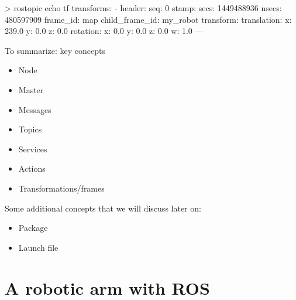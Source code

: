 \documentclass[compress]{beamer}
\begin{document}
%
%
%
%

\begin{frame}[containsverbatim]{}
\begin{shcode}
> rostopic echo tf
transforms: 
  - 
    header: 
      seq: 0
      stamp: 
        secs: 1449488936
        nsecs: 480597909
      frame_id: map
    child_frame_id: my_robot
    transform: 
      translation: 
        x: 239.0
        y: 0.0
        z: 0.0
      rotation: 
        x: 0.0
        y: 0.0
        z: 0.0
        w: 1.0
---

\end{shcode}

\end{frame}

\begin{frame}{To summarize: key concepts}
    \begin{itemize}
        \item Node
        \item Master
        \item Messages
        \item Topics
        \item Services
        \item Actions
        \item Transformations/frames
    \end{itemize}

    \pause

    Some additional concepts that we will discuss later on:
    \begin{itemize}
        \item Package
        \item Launch file
    \end{itemize}
\end{frame}


\section[Robot arm]{A robotic arm with ROS}
\end{document}
